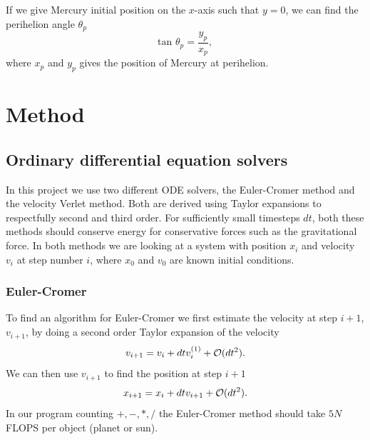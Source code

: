 \documentclass[norsk,a4paper,12pt]{article}
\begin{document}
{If we give Mercury initial position on the $x$-axis such that $y=0$, we can find the perihelion angle $\theta_p$
\begin{equation}
\text{tan }\theta_p = \frac{y_p}{x_p},
\label{eq:perihelionangle}
\end{equation}
where $x_p$ and $y_p$ gives the position of Mercury at perihelion.
\section{Method}
\subsection{Ordinary differential equation solvers}
In this project we use two different ODE solvers, the Euler-Cromer method and the velocity Verlet method. Both are derived using Taylor expansions to respectfully second and third order. For sufficiently small timesteps $dt$, both these methods should conserve energy for conservative forces such as the gravitational force. In both methods we are looking at a system with position $x_i$ and velocity $v_i$ at step number $i$, where $x_0$ and $v_0$ are known initial conditions.
\subsubsection{Euler-Cromer}
To find an algorithm for Euler-Cromer we first estimate the velocity at step $i+1$, $v_{i+1}$, by doing a second order Taylor expansion of the velocity 
\begin{equation}
v_{i+1} = v_i + dtv_i^{(1)} + {\cal O}(dt^2). 
\label{eq:EulCrov}
\end{equation}
We can then use $v_{i+1}$ to find the position at step $i+1$
\begin{equation}
x_{i+1} = x_i + dtv_{i+1} + {\cal O}(dt^2).
\label{eq:EulCrox}
\end{equation}
In our program counting $+,-,*,/$ the Euler-Cromer method should take $5N$ FLOPS per object (planet or sun).
}
\end{document}
